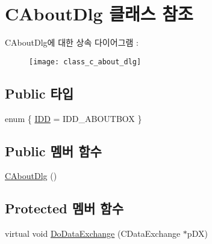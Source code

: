 \hypertarget{class_c_about_dlg}{\section{C\-About\-Dlg 클래스 참조}
\label{class_c_about_dlg}
}
C\-About\-Dlg에 대한 상속 다이어그램 \-: \begin{figure}[H]
\begin{center}
\leavevmode
\texttt{[image: class\_c\_about\_dlg]}
\end{center}
\end{figure}
\subsection*{Public 타입}
\begin{DoxyCompactItemize}
\item 
enum \{ \hyperlink{class_c_about_dlg_ab29e21bead9ca10b63b4628e8f8e4325ab6703c7538518b2b788243189e9f7981}{I\-D\-D} = I\-D\-D\-\_\-\-A\-B\-O\-U\-T\-B\-O\-X
 \}
\end{DoxyCompactItemize}
\subsection*{Public 멤버 함수}
\begin{DoxyCompactItemize}
\item 
\hyperlink{class_c_about_dlg_a6d1e6a33fef23bee6e75254189d865ce}{C\-About\-Dlg} ()
\end{DoxyCompactItemize}
\subsection*{Protected 멤버 함수}
\begin{DoxyCompactItemize}
\item 
virtual void \hyperlink{class_c_about_dlg_ab83db7484fec957282d7d5a21aed4df4}{Do\-Data\-Exchange} (C\-Data\-Exchange $\ast$p\-D\-X)
\end{DoxyCompactItemize}



